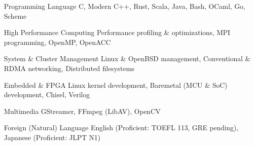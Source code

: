 

\begin{cvskills}

  \cvskill
    {Programming Language} %
    {C, Modern C++, Rust, Scala, Java, Bash, OCaml, Go, Scheme} %

  \cvskill
    {High Performance Computing} %
    {Performance profiling \& optimizations, MPI programming, OpenMP, OpenACC} %

  \cvskill
    {System \& Cluster Management} %
    {Linux \& OpenBSD management, Conventional \& RDMA networking, Distributed filesystems} %

  \cvskill
    {Embedded \& FPGA}
    {Linux kernel development, Baremetal (MCU \& SoC) development, Chisel, Verilog}

  \cvskill
    {Multimedia}
    {GStreamer, FFmpeg (LibAV), OpenCV}

  \cvskill
    {Foreign (Natural) Language} %
    {English (Proficient: TOEFL 113, GRE pending), Japanese (Proficient: JLPT N1)} %

\end{cvskills}
